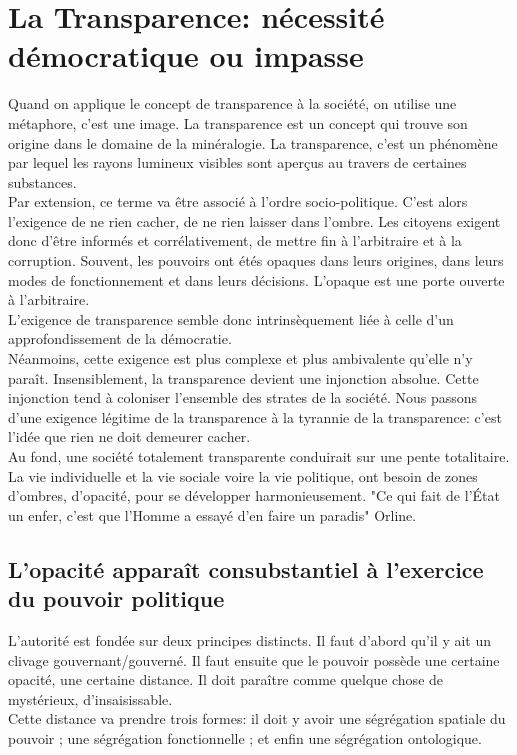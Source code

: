 \documentclass[10pt, a4paper, openany]{book}
\begin{document}
\section{La Transparence: nécessité démocratique ou impasse}

Quand on applique le concept de transparence à la société, on utilise une métaphore, c'est une image. La transparence est un concept qui trouve son origine dans le domaine de la minéralogie. La transparence, c'est un phénomène par lequel les rayons lumineux visibles sont aperçus au travers de certaines substances. \\
Par extension, ce terme va être associé à l'ordre socio-politique. C'est alors l'exigence de ne rien cacher, de ne rien laisser dans l'ombre. Les citoyens exigent donc d'être informés et corrélativement, de mettre fin à l'arbitraire et à la corruption. Souvent, les pouvoirs ont étés opaques dans leurs origines, dans leurs modes de fonctionnement et dans leurs décisions. L'opaque est une porte ouverte à l'arbitraire. \\
L'exigence de transparence semble donc intrinsèquement liée à celle d'un approfondissement de la démocratie. \\
Néanmoins, cette exigence est plus complexe et plus ambivalente qu'elle n'y paraît. Insensiblement, la transparence devient une injonction absolue. Cette injonction tend à coloniser l'ensemble des strates de la société. Nous passons d'une exigence légitime de la transparence à la tyrannie de la transparence: c'est l'idée que rien ne doit demeurer cacher. \\
Au fond, une société totalement transparente conduirait sur une pente totalitaire. La vie individuelle et la vie sociale voire la vie politique, ont besoin de zones d'ombres, d'opacité, pour se développer harmonieusement. "Ce qui fait de l'État un enfer, c'est que l'Homme a essayé d'en faire un paradis" Orline. 

\subsection{L'opacité apparaît consubstantiel à l'exercice du pouvoir politique}

L'autorité est fondée sur deux principes distincts. Il faut d'abord qu'il y ait un clivage gouvernant/gouverné. Il faut ensuite que le pouvoir possède une certaine opacité, une certaine distance. Il doit paraître comme quelque chose de mystérieux, d'insaisissable. \\
Cette distance va prendre trois formes: il doit y avoir une ségrégation spatiale du pouvoir ; une ségrégation fonctionnelle ; et enfin une ségrégation ontologique. 
\end{document}

